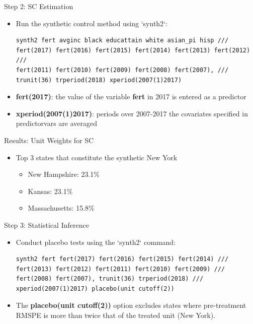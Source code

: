 \documentclass[hyperref={pdfpagelabels=false}]{beamer}
\begin{document}
\begin{frame}[fragile]{Step 2: SC Estimation}
\begin{itemize}
	\item Run the synthetic control method using `synth2`:
\begin{lstlisting}
synth2 fert avginc black educattain white asian_pi hisp ///
fert(2017) fert(2016) fert(2015) fert(2014) fert(2013) fert(2012) ///
fert(2011) fert(2010) fert(2009) fert(2008) fert(2007), ///
trunit(36) trperiod(2018) xperiod(2007(1)2017)
\end{lstlisting}
\vspace{0.2cm}
\item \textbf{fert(2017)}: the value of the variable \textbf{fert} in 2017 is entered as a predictor
\vspace{0.2cm}
\item \textbf{xperiod(2007(1)2017)}: periods over 2007-2017 the covariates specified in predictorvars are averaged
\end{itemize}
\end{frame}


\begin{frame}{Results: Unit Weights for SC}
\begin{itemize}
	\item Top 3 states that constitute the synthetic New York
	\begin{itemize}
		\vspace{0.2cm}
		\item New Hampshire: 23.1\%
		\vspace{0.2cm}
		\item Kansas: 23.1\%
		\vspace{0.2cm}
		\item Massachusetts: 15.8\%		
	\end{itemize}
	
	
\end{itemize}
\end{frame}


\begin{frame}[fragile]{Step 3: Statistical Inference}
\begin{itemize}
\item Conduct placebo tests using the `synth2` command:
\begin{lstlisting}
synth2 fert fert(2017) fert(2016) fert(2015) fert(2014) ///
fert(2013) fert(2012) fert(2011) fert(2010) fert(2009) ///
fert(2008) fert(2007), trunit(36) trperiod(2018) ///
xperiod(2007(1)2017) placebo(unit cutoff(2))
\end{lstlisting}
	\item The \textbf{placebo(unit cutoff(2))} option excludes states where pre-treatment RMSPE is more than twice that of the treated unit (New York).
\end{itemize}
\end{frame}
\end{document}
